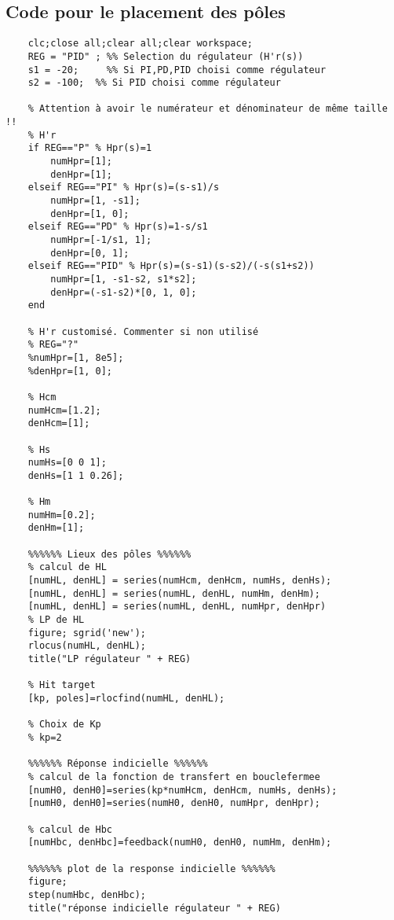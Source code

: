 \subsection{Code pour le placement des pôles}
\begin{lstlisting}[style=Matlab-bw,basicstyle=\ttfamily\scriptsize,caption={Code paramètre régulateur méthode de placement des pôles}, label={code Matlab}]
	%%%%%% Methode de placment des pôles %%%%%%
	clc;close all;clear all;clear workspace;
	REG = "PID" ; %% Selection du régulateur (H'r(s))
	s1 = -20;     %% Si PI,PD,PID choisi comme régulateur
	s2 = -100;  %% Si PID choisi comme régulateur
	
	% Attention à avoir le numérateur et dénominateur de même taille !!	
	% H'r
	if REG=="P" % Hpr(s)=1
		numHpr=[1];
		denHpr=[1];
	elseif REG=="PI" % Hpr(s)=(s-s1)/s
		numHpr=[1, -s1];
		denHpr=[1, 0];
	elseif REG=="PD" % Hpr(s)=1-s/s1
		numHpr=[-1/s1, 1];
		denHpr=[0, 1];
	elseif REG=="PID" % Hpr(s)=(s-s1)(s-s2)/(-s(s1+s2))
		numHpr=[1, -s1-s2, s1*s2];
		denHpr=(-s1-s2)*[0, 1, 0];
	end
	
	% H'r customisé. Commenter si non utilisé
	% REG="?"
	%numHpr=[1, 8e5];
	%denHpr=[1, 0];
	
	% Hcm
	numHcm=[1.2];
	denHcm=[1];
	
	% Hs
	numHs=[0 0 1];
	denHs=[1 1 0.26];
	
	% Hm
	numHm=[0.2];
	denHm=[1];
	
	%%%%%% Lieux des pôles %%%%%%
	% calcul de HL
	[numHL, denHL] = series(numHcm, denHcm, numHs, denHs);
	[numHL, denHL] = series(numHL, denHL, numHm, denHm);
	[numHL, denHL] = series(numHL, denHL, numHpr, denHpr)
	% LP de HL
	figure; sgrid('new');
	rlocus(numHL, denHL);
	title("LP régulateur " + REG)
	
	% Hit target
	[kp, poles]=rlocfind(numHL, denHL);
	
	% Choix de Kp
	% kp=2
	
	%%%%%% Réponse indicielle %%%%%%
	% calcul de la fonction de transfert en bouclefermee
	[numH0, denH0]=series(kp*numHcm, denHcm, numHs, denHs);
	[numH0, denH0]=series(numH0, denH0, numHpr, denHpr);
	
	% calcul de Hbc
	[numHbc, denHbc]=feedback(numH0, denH0, numHm, denHm);
	
	%%%%%% plot de la response indicielle %%%%%%
	figure;
	step(numHbc, denHbc);
	title("réponse indicielle régulateur " + REG)
\end{lstlisting}

